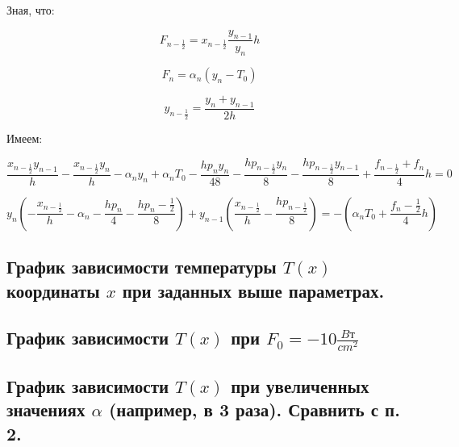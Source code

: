 Зная, что: 

\begin{equation*}
	F_{n - \frac{1}{2}} = x_{n - \frac{1}{2}} \frac{y_{n - 1}}{y_n}{h}
\end{equation*}

\begin{equation*}
	F_{n} = \alpha_{n}(y_{n} - T_{0})
\end{equation*}

\begin{equation*}
	y_{n - \frac{1}{2}} = \frac{y_{n} + y_{n - 1}}{2h}
\end{equation*}

Имеем:

\begin{equation*}
	\frac{x_{n - \frac{1}{2}} y_{n - 1}}{h} - \frac{x_{n - \frac{1}{2}}y_{n}}{h} - \alpha_{n}y_{n} + \alpha_{n} T_{0} - \frac{hp_{n}y_{n}}{48} - \frac{hp_{n - \frac{1}{2}}y_{n}}{8} - \frac{hp_{n - \frac{1}{2}}y_{n - 1}}{8} + \frac{f_{n - \frac{1}{2}} + f_{n}}{4}h = 0
\end{equation*}

\begin{equation*}
	y_{n}(-\frac{x_{n - \frac{1}{2}}}{h} - \alpha_{n} - \frac{hp_{n}}{4} - \frac{hp_{n} - \frac{1}{2}}{8}) + y_{n - 1}(\frac{x_{n - \frac{1}{2}}}{h} - \frac{hp_{n - \frac{1}{2}}}{8}) = -(\alpha_{n}T_{0} + \frac{f_{n} - \frac{1}{2}}{4}h)
\end{equation*}

\clearpage

\subsection{График зависимости температуры $T(x)$ координаты $x$ при заданных выше параметрах.}


\clearpage

\subsection{График зависимости $T(x)$ при $F_{0} = -10 \frac{Bт}{cm^2}$}


\clearpage

\subsection{График зависимости $T(x)$ при увеличенных значениях $\alpha$ (например, в 3 раза). Сравнить с п. 2.}

